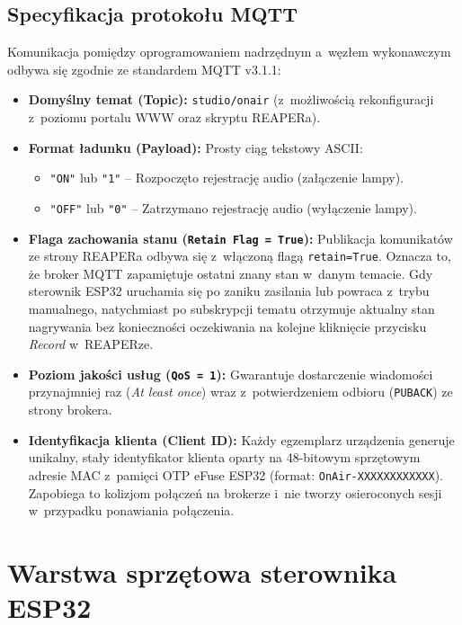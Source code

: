 \documentclass[11pt,a4paper]{article}
\begin{document}
\subsection{Specyfikacja protokołu MQTT}
Komunikacja pomiędzy oprogramowaniem nadrzędnym a~węzłem wykonawczym odbywa się zgodnie ze standardem MQTT v3.1.1:
\begin{itemize}[leftmargin=1.5em]
    \item \textbf{Domyślny temat (Topic):} \texttt{studio/onair} (z~możliwością rekonfiguracji z~poziomu portalu WWW oraz skryptu REAPERa).
    \item \textbf{Format ładunku (Payload):} Prosty ciąg tekstowy ASCII:
    \begin{itemize}
        \item \texttt{"ON"} lub \texttt{"1"} -- Rozpoczęto rejestrację audio (załączenie lampy).
        \item \texttt{"OFF"} lub \texttt{"0"} -- Zatrzymano rejestrację audio (wyłączenie lampy).
    \end{itemize}
    \item \textbf{Flaga zachowania stanu (\texttt{Retain Flag = True}):} Publikacja komunikatów ze strony REAPERa odbywa się z~włączoną flagą \texttt{retain=True}. Oznacza to, że broker MQTT zapamiętuje ostatni znany stan w~danym temacie. Gdy sterownik ESP32 uruchamia się po zaniku zasilania lub powraca z~trybu manualnego, natychmiast po subskrypcji tematu otrzymuje aktualny stan nagrywania bez konieczności oczekiwania na kolejne kliknięcie przycisku \textit{Record} w~REAPERze.
    \item \textbf{Poziom jakości usług (\texttt{QoS = 1}):} Gwarantuje dostarczenie wiadomości przynajmniej raz (\textit{At least once}) wraz z~potwierdzeniem odbioru (\texttt{PUBACK}) ze strony brokera.
    \item \textbf{Identyfikacja klienta (Client ID):} Każdy egzemplarz urządzenia generuje unikalny, stały identyfikator klienta oparty na 48-bitowym sprzętowym adresie MAC z~pamięci OTP eFuse ESP32 (format: \texttt{OnAir-XXXXXXXXXXXX}). Zapobiega to kolizjom połączeń na brokerze i~nie tworzy osieroconych sesji w~przypadku ponawiania połączenia.
\end{itemize}

\newpage

\section{Warstwa sprzętowa sterownika ESP32}
\end{document}
